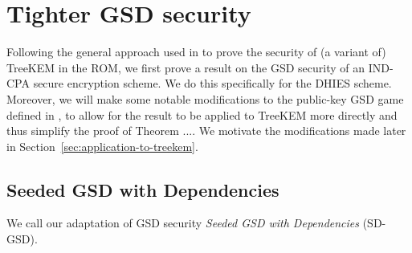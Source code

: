 \chapter{Tighter GSD security}



Following the general approach used in \cite{ttkem} to prove the security of (a variant of) TreeKEM in the ROM, we first prove a result on the GSD security of an IND-CPA secure encryption scheme. We do this specifically for the DHIES scheme. Moreover, we will make some notable modifications to the public-key GSD game defined in \cite{ttkem}, to allow for the result to be applied to TreeKEM more directly and thus simplify the proof of Theorem .... We motivate the modifications made later in Section~\vref{sec:application-to-treekem}.

\section{Seeded GSD with Dependencies}

We call our adaptation of GSD security \emph{Seeded GSD with Dependencies} (SD-GSD).







